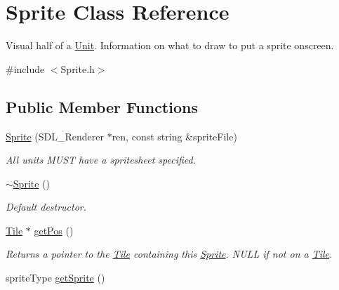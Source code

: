 \hypertarget{class_sprite}{}\section{Sprite Class Reference}
\label{class_sprite}


Visual half of a \hyperlink{class_unit}{Unit}. Information on what to draw to put a sprite onscreen.  




{\ttfamily \#include $<$Sprite.\+h$>$}

\subsection*{Public Member Functions}
\begin{DoxyCompactItemize}
\item 
\hyperlink{class_sprite_aae9fc5691e7263139e9e8d1d969cba5c}{Sprite} (S\+D\+L\+\_\+\+Renderer $\ast$ren, const string \&sprite\+File)\hypertarget{class_sprite_aae9fc5691e7263139e9e8d1d969cba5c}{}\label{class_sprite_aae9fc5691e7263139e9e8d1d969cba5c}

\begin{DoxyCompactList}\small\item\em All units M\+U\+ST have a spritesheet specified. \end{DoxyCompactList}\item 
\hyperlink{class_sprite_a8accab430f9d90ae5117b57d67e32b84}{$\sim$\+Sprite} ()\hypertarget{class_sprite_a8accab430f9d90ae5117b57d67e32b84}{}\label{class_sprite_a8accab430f9d90ae5117b57d67e32b84}

\begin{DoxyCompactList}\small\item\em Default destructor. \end{DoxyCompactList}\item 
\hyperlink{class_tile}{Tile} $\ast$ \hyperlink{class_sprite_a6c4961079fab937172061be32d654e85}{get\+Pos} ()\hypertarget{class_sprite_a6c4961079fab937172061be32d654e85}{}\label{class_sprite_a6c4961079fab937172061be32d654e85}

\begin{DoxyCompactList}\small\item\em Returns a pointer to the \hyperlink{class_tile}{Tile} containing this \hyperlink{class_sprite}{Sprite}. N\+U\+LL if not on a \hyperlink{class_tile}{Tile}. \end{DoxyCompactList}\item 
sprite\+Type \hyperlink{class_sprite_a01742e39c9f18622a094a187d6858912}{get\+Sprite} ()\hypertarget{class_sprite_a01742e39c9f18622a094a187d6858912}{}\label{class_sprite_a01742e39c9f18622a094a187d6858912}


\end{DoxyCompactItemize}
